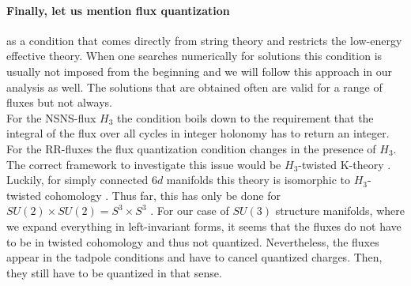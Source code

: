 \documentclass[a4paper,12pt]{report}
\begin{document}
\paragraph{Finally, let us mention flux quantization} as a condition that comes directly from string theory and restricts the low-energy effective theory. When one searches numerically for solutions this condition is usually not imposed from the beginning and we will follow this approach in our analysis as well. The solutions that are obtained often are valid for a range of fluxes but not always.\\
For the NSNS-flux $H_3$ the condition boils down to the requirement that the integral of the flux over all cycles in integer holonomy has to return an integer. For the RR-fluxes the flux quantization condition changes in the presence of $H_3$. The correct framework to investigate this issue would be $H_3$-twisted K-theory \cite{Moore:1999gb,Minasian:1997mm}. Luckily, for simply connected $6d$ manifolds this theory is isomorphic to $H_3$-twisted cohomology \cite{Collinucci:2006ug}. Thus far, this has only be done for $SU(2)\times SU(2) = S^ 3 \times S^ 3$ \cite{Danielsson:2011au}.
For our case of $SU(3)$ structure manifolds, where we expand everything in left-invariant forms, it seems that the fluxes do not have to be in twisted cohomology and thus not quantized. Nevertheless, the fluxes appear in the tadpole conditions and have to cancel quantized charges. Then, they still have to be quantized in that sense.
\end{document}
